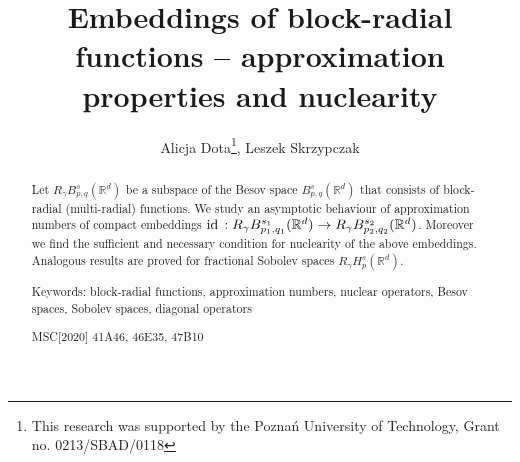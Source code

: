 \documentclass[12pt]{article}
\def\id{\mathop{\rm id \,}\nolimits}
\newcommand{\Rd}{{\mathbb R}^{d}}
\newcommand{\R}{{\mathbb R}}
\begin{document}
	
	
	
	\title{Embeddings  of  block-radial functions -- approximation properties and nuclearity }
	\author{ Alicja Dota\thanks{This research was supported  by the Pozna\'n University of Technology,  Grant no.  0213/SBAD/0118}, Leszek Skrzypczak} 
	\date{ }
	
	
	\maketitle




	
	\begin{abstract}
		 Let $ R_\gamma B^{s}_{p,q}(\Rd)$ be a subspace of the Besov space $B^{s}_{p,q}(\Rd)$ that consists of block-radial (multi-radial)  functions. We study an asymptotic behaviour of approximation numbers of compact embeddings $\id: R_\gamma B^{s_1}_{p_1,q_1}(\R^d) \rightarrow  R_\gamma B^{s_2}_{p_2,q_2}(\R^d)$.  Moreover we find the sufficient and necessary condition for nuclearity of the above embeddings. Analogous results are proved for fractional Sobolev spaces  $R_\gamma H^s_p(\Rd)$. 
		
		 Keywords: block-radial functions, approximation numbers, nuclear operators, Besov spaces, Sobolev spaces, diagonal operators 
		 
		 MSC[2020] 41A46, 46E35,  47B10 
	\end{abstract}
	
	
	
\end{document}
